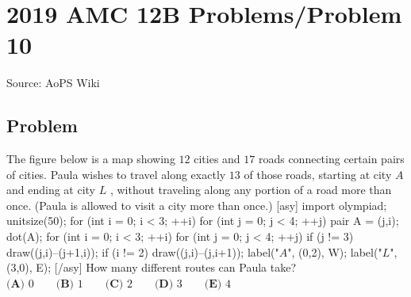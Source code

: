 \documentclass[12pt]{article}
\begin{document}
\section*{{2019 AMC 12B Problems/Problem 10}}
Source: AoPS Wiki

\subsection*{Problem}
The figure below is a map showing $12$ cities and $17$ roads connecting certain pairs of cities. Paula wishes to travel along exactly $13$ of those roads, starting at city $A$ and ending at city $L$ , without traveling along any portion of a road more than once. (Paula is allowed to visit a city more than once.) [asy] import olympiad; unitsize(50); for (int i = 0; i < 3; ++i) { for (int j = 0; j < 4; ++j) { pair A = (j,i); dot(A); } } for (int i = 0; i < 3; ++i) { for (int j = 0; j < 4; ++j) { if (j != 3) { draw((j,i)--(j+1,i)); } if (i != 2) { draw((j,i)--(j,i+1)); } } } label("$A$", (0,2), W); label("$L$", (3,0), E); [/asy] How many different routes can Paula take? $\textbf{(A) } 0 \qquad\textbf{(B) } 1 \qquad\textbf{(C) } 2 \qquad\textbf{(D) } 3 \qquad\textbf{(E) } 4$
\end{document}
